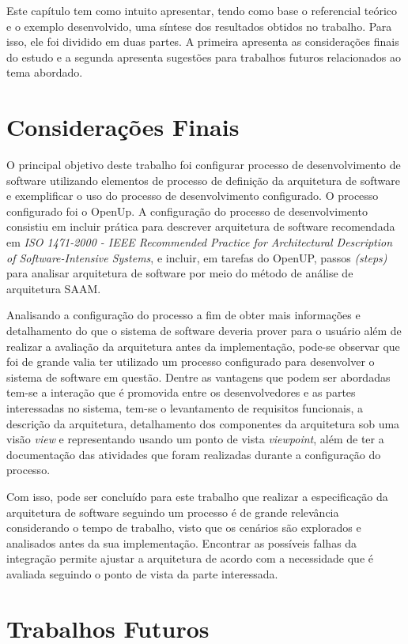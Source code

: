 Este capítulo tem como intuito apresentar, tendo como base o referencial teórico e o exemplo desenvolvido, uma síntese dos resultados obtidos no trabalho. Para isso, ele foi dividido em duas partes. A primeira apresenta as considerações finais do estudo e a segunda apresenta sugestões para trabalhos futuros relacionados ao tema abordado.

\section{Considerações Finais}
O principal objetivo deste trabalho foi configurar processo de desenvolvimento de software utilizando elementos de processo de definição da arquitetura de software e exemplificar o uso do processo de desenvolvimento configurado. O processo configurado foi o OpenUp.  A configuração do processo de desenvolvimento consistiu em incluir prática para descrever arquitetura de software recomendada em \emph{ISO 1471-2000 - IEEE Recommended Practice for Architectural Description of Software-Intensive Systems}, e incluir, em tarefas do OpenUP, passos \emph{(steps)} para analisar arquitetura de software por meio do método de análise de arquitetura \acrfull{SAAM}.

Analisando a configuração do processo a fim de obter mais informações e detalhamento do que o sistema de software deveria prover para o usuário além de realizar a avaliação da arquitetura antes da implementação, pode-se observar que foi de grande valia ter utilizado um processo configurado para desenvolver o sistema de software em questão. Dentre as vantagens que podem ser abordadas tem-se a interação que é promovida entre os desenvolvedores e as partes interessadas no sistema, tem-se o levantamento de requisitos funcionais, a descrição da arquitetura, detalhamento dos componentes da arquitetura sob uma visão \emph{view} e representando usando um ponto de vista \emph{viewpoint}, além de ter a documentação das atividades que foram realizadas durante a configuração do processo.

Com isso, pode ser concluído para este trabalho que realizar a especificação da arquitetura de software seguindo um processo é de grande relevância considerando o tempo de trabalho, visto que os cenários são explorados e analisados antes da sua implementação. Encontrar as possíveis falhas da integração permite ajustar a arquitetura de acordo com a necessidade que é avaliada seguindo o ponto de vista da parte interessada.

\section{Trabalhos Futuros}

